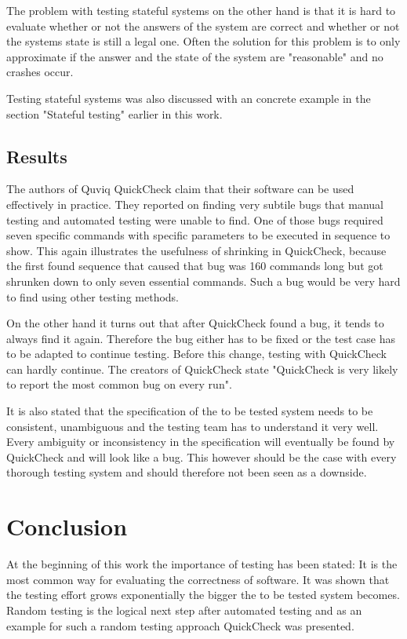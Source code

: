 \documentclass[a4paper, 12pt]{article} %
\begin{document}
The problem with testing stateful systems on the other hand is that it is hard to evaluate whether or not the answers of the system are correct and whether or not the systems state is still a legal one. Often the solution for this problem is to only approximate if the answer and the state of the system are "reasonable" and no crashes occur.

Testing stateful systems was also discussed with an concrete example in the section "Stateful testing" earlier in this work.

\subsection{Results}

The authors of Quviq QuickCheck claim that their software can be used effectively in practice. They reported on finding very subtile bugs that manual testing and automated testing were unable to find. One of those bugs required seven specific commands with specific parameters to be executed in sequence to show. This again illustrates the usefulness of shrinking in QuickCheck, because the first found sequence that caused that bug was 160 commands long but got shrunken down to only seven essential commands. Such a bug would be very hard to find using other testing methods. \cite{Arts06}

On the other hand it turns out that after QuickCheck found a bug, it tends to always find it again. Therefore the bug either has to be fixed or the test case has to be adapted to continue testing. Before this change, testing with QuickCheck can hardly continue. The creators of QuickCheck state "QuickCheck is very likely to report the most common bug on every run". \cite{Arts06}

It is also stated that the specification of the to be tested system needs to be consistent, unambiguous and the testing team has to understand it very well. Every ambiguity or inconsistency in the specification will eventually be found by QuickCheck and will look like a bug. This however should be the case with every thorough testing system and should therefore not been seen as a downside. \cite{Arts06}

\newpage
\section{Conclusion}


At the beginning of this work the importance of testing has been stated: It is the most common way for evaluating the correctness of software. It was shown that the testing effort grows exponentially the bigger the to be tested system becomes. Random testing is the logical next step after automated testing and as an example for such a random testing approach QuickCheck was presented.  
\end{document}
